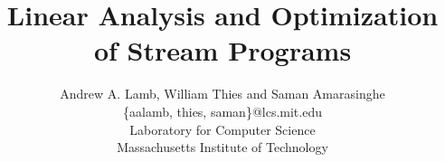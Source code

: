 \documentclass{sig-alternate}
\title{Linear Analysis and Optimization of Stream Programs}
\author{
\alignauthor \vspace{-18pt}
Andrew A. Lamb,
William Thies
and Saman Amarasinghe\\
	\vspace{8pt}
	\{aalamb, thies, saman\}@lcs.mit.edu \\
	\vspace{8pt}
	Laboratory for Computer Science \\
	Massachusetts Institute of Technology}
\begin{document}
\newtheorem{definition}{Definition}
\newtheorem{transformation}{Transformation}

\maketitle

\newcommand{\mt}[1]{\mbox{\it #1}}
\newcommand{\todo}[1]{\framebox{\bf #1}}

\begin{abstract}

\end{abstract}




%






\begin{small}
  
  
\end{small}

\clearpage

\clearpage

\end{document}
